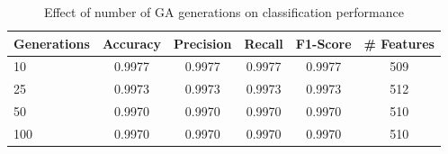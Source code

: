 \begin{table}[htbp]
\centering
\caption{Effect of number of GA generations on classification performance}
\label{tab:table12}
\begin{tabular}{lccccc}
\toprule
Generations & Accuracy & Precision & Recall & F1-Score & \# Features \\
\midrule
10 & 0.9977 & 0.9977 & 0.9977 & 0.9977 & 509 \\
25 & 0.9973 & 0.9973 & 0.9973 & 0.9973 & 512 \\
50 & 0.9970 & 0.9970 & 0.9970 & 0.9970 & 510 \\
100 & 0.9970 & 0.9970 & 0.9970 & 0.9970 & 510 \\
\bottomrule
\end{tabular}
\end{table}